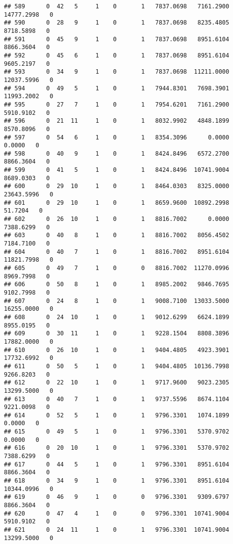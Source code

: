 \documentclass[
]{article}
\begin{document}
\begin{enumerate}
\begin{verbatim}
## 589      0  42   5     1    0       1   7837.0698   7161.2900  14777.2998   0
## 590      0  28   9     1    0       1   7837.0698   8235.4805   8718.5898   0
## 591      0  45   9     1    0       1   7837.0698   8951.6104   8866.3604   0
## 592      0  45   6     1    0       1   7837.0698   8951.6104   9605.2197   0
## 593      0  34   9     1    0       1   7837.0698  11211.0000  12037.5996   0
## 594      0  49   5     1    0       1   7944.8301   7698.3901  11993.2002   0
## 595      0  27   7     1    0       1   7954.6201   7161.2900   5910.9102   0
## 596      0  21  11     1    0       1   8032.9902   4848.1899   8570.8096   0
## 597      0  54   6     1    0       1   8354.3096      0.0000      0.0000   0
## 598      0  40   9     1    0       1   8424.8496   6572.2700   8866.3604   0
## 599      0  41   5     1    0       1   8424.8496  10741.9004   8689.0303   0
## 600      0  29  10     1    0       1   8464.0303   8325.0000  23643.5996   0
## 601      0  29  10     1    0       1   8659.9600  10892.2998     51.7204   0
## 602      0  26  10     1    0       1   8816.7002      0.0000   7388.6299   0
## 603      0  40   8     1    0       1   8816.7002   8056.4502   7184.7100   0
## 604      0  40   7     1    0       1   8816.7002   8951.6104  11821.7998   0
## 605      0  49   7     1    0       0   8816.7002  11270.0996   8969.7998   0
## 606      0  50   8     1    0       1   8985.2002   9846.7695   9102.7998   0
## 607      0  24   8     1    0       1   9008.7100  13033.5000  16255.0000   0
## 608      0  24  10     1    0       1   9012.6299   6624.1899   8955.0195   0
## 609      0  30  11     1    0       1   9228.1504   8808.3896  17882.0000   0
## 610      0  26  10     1    0       1   9404.4805   4923.3901  17732.6992   0
## 611      0  50   5     1    0       1   9404.4805  10136.7998   9266.8203   0
## 612      0  22  10     1    0       1   9717.9600   9023.2305  13299.5000   0
## 613      0  40   7     1    0       1   9737.5596   8674.1104   9221.0098   0
## 614      0  52   5     1    0       1   9796.3301   1074.1899      0.0000   0
## 615      0  49   5     1    0       1   9796.3301   5370.9702      0.0000   0
## 616      0  20  10     1    0       1   9796.3301   5370.9702   7388.6299   0
## 617      0  44   5     1    0       1   9796.3301   8951.6104   8866.3604   0
## 618      0  34   9     1    0       1   9796.3301   8951.6104  10344.0996   0
## 619      0  46   9     1    0       0   9796.3301   9309.6797   8866.3604   0
## 620      0  47   4     1    0       0   9796.3301  10741.9004   5910.9102   0
## 621      0  24  11     1    0       1   9796.3301  10741.9004  13299.5000   0

\end{verbatim}
\end{enumerate}
\end{document}
